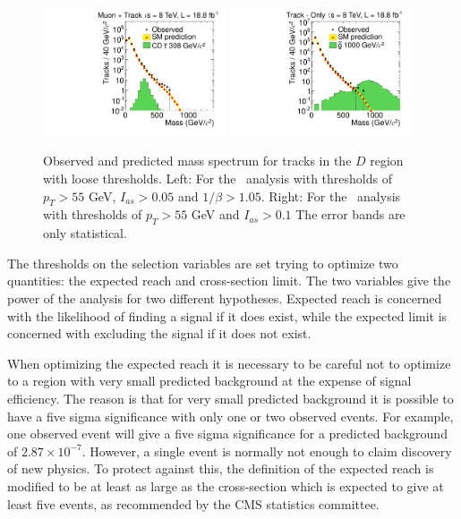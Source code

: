 \begin{figure}
 \begin{center}
  \includegraphics[clip=false, trim=0.0cm 0cm 0.0cm 0cm, width=0.48\textwidth]{figures/tkmu/RescaleNoRatio_Mass_8TeV_LooseNoSMMC}
  \includegraphics[clip=false, trim=0.0cm 0cm 0.0cm 0cm, width=0.48\textwidth]{figures/tkonly/RescaleNoRatio_Mass_8TeV_LooseNoSMMC}
 \end{center}
 \caption[Observed and predicted mass spectrum for tracks in the signal region with loose thresholds in the \tktof\ and \tkonly\ analyses.]
{Observed and predicted mass spectrum for tracks in the $D$ region with loose thresholds.
Left: For the \tktof\ analysis with thresholds of $p_T > 55$ GeV, $I_{as}>0.05$ and $1/\beta>1.05$.
Right: For the \tkonly\ analysis with thresholds of $p_T > 55$ GeV and $I_{as}>0.1$
The error bands are only statistical.}
\label{fig:MassDistribution}
\end{figure}

The thresholds on the selection variables are set trying to optimize two quantities: the expected reach and cross-section limit.
The two variables give the power of the analysis for two different hypotheses. Expected reach is concerned with the likelihood of finding a signal if it does exist, while the
expected limit is concerned with excluding the signal if it does not exist.

When optimizing the expected reach it is necessary to be careful not to optimize to
a region with very small predicted background at the expense of signal efficiency. 
The reason is that for very small predicted background it is possible to have a five sigma
significance with only one or two observed events. For example, one observed event will give a five sigma significance for a predicted background of $2.87\times10^{-7}$.
However, a single event is normally not enough to claim discovery of new physics.
To protect against this, the definition of the expected reach is modified to be at least as large as
the cross-section which is expected to give at least five events, as recommended by the CMS statistics committee.

